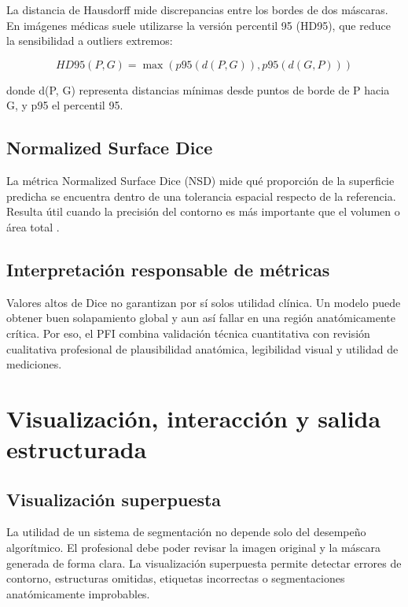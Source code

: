 La distancia de Hausdorff mide discrepancias entre los bordes de dos máscaras. En imágenes médicas suele utilizarse la versión percentil 95 (HD95), que reduce la sensibilidad a outliers extremos:

\begin{equation}
HD95(P, G) = \max( p95(d(P, G)), p95(d(G, P)) )
\end{equation}

donde d(P, G) representa distancias mínimas desde puntos de borde de P hacia G, y p95 el percentil 95.

\subsection{Normalized Surface Dice}

La métrica Normalized Surface Dice (NSD) mide qué proporción de la superficie predicha se encuentra dentro de una tolerancia espacial respecto de la referencia. Resulta útil cuando la precisión del contorno es más importante que el volumen o área total \parencite{maierhein_metrics_reloaded_2024}.

\subsection{Interpretación responsable de métricas}

Valores altos de Dice no garantizan por sí solos utilidad clínica. Un modelo puede obtener buen solapamiento global y aun así fallar en una región anatómicamente crítica. Por eso, el PFI combina validación técnica cuantitativa con revisión cualitativa profesional de plausibilidad anatómica, legibilidad visual y utilidad de mediciones.

\section{Visualización, interacción y salida estructurada}

\subsection{Visualización superpuesta}

La utilidad de un sistema de segmentación no depende solo del desempeño algorítmico. El profesional debe poder revisar la imagen original y la máscara generada de forma clara. La visualización superpuesta permite detectar errores de contorno, estructuras omitidas, etiquetas incorrectas o segmentaciones anatómicamente improbables.

